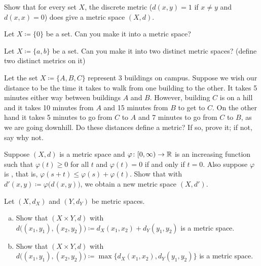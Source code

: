 \begin{exercise}
Show that for every set $X$, the discrete metric ($d(x,y) = 1$ if $x \neq y$ and
$d(x,x) = 0$) does give a metric space $(X,d)$.
\end{exercise}

\begin{exercise}
Let $X \coloneqq \{ 0 \}$ be a set.  Can you make it into a metric space?
\end{exercise}

\begin{exercise}
Let $X \coloneqq \{ a, b \}$ be a set.  Can you make it into two distinct metric
spaces?  (define two distinct metrics on it)
\end{exercise}

\begin{exercise}
Let the set $X \coloneqq \{ A, B, C \}$ represent 3 buildings on campus.  Suppose we
wish our distance to be the time it takes to walk from one building to
the other.
It takes 5 minutes either way between buildings $A$ and $B$.  However,
building $C$ is on a hill and it takes 10 minutes from $A$ and 15 minutes
from $B$ to get to $C$.  On the other hand it takes 5 minutes to go
from $C$ to $A$ and 7 minutes to go from $C$ to $B$, as we are going
downhill.  Do these distances define a metric?  If so, prove it; if not, say
why not.
\end{exercise}

\begin{exercise}
Suppose $(X,d)$ is a metric space and
$\varphi \colon [0,\infty) \to {\mathbb{R}}$ is
an increasing function such that 
$\varphi(t) \geq 0$ for all $t$ and $\varphi(t) = 0$ if and only if
$t=0$.  Also suppose $\varphi$ is \emph{},
that is, $\varphi(s+t) \leq \varphi(s)+\varphi(t)$.
Show that with $d'(x,y) \coloneqq \varphi\bigl(d(x,y)\bigr)$, we obtain a new
metric space $(X,d')$.
\end{exercise}

\begin{exercise} \label{exercise:mscross}
Let $(X,d_X)$ and $(Y,d_Y)$ be metric spaces.
\begin{enumerate}[a)]
\item
Show that $(X \times Y,d)$ with
$d\bigl( (x_1,y_1), (x_2,y_2) \bigr) \coloneqq d_X(x_1,x_2) + d_Y(y_1,y_2)$ is
a metric space.
\item
Show that $(X \times Y,d)$ with
$d\bigl( (x_1,y_1), (x_2,y_2) \bigr) \coloneqq \max \bigl\{ d_X(x_1,x_2) ,
d_Y(y_1,y_2) \bigr\}$ is
a metric space.
\end{enumerate}
\end{exercise}

